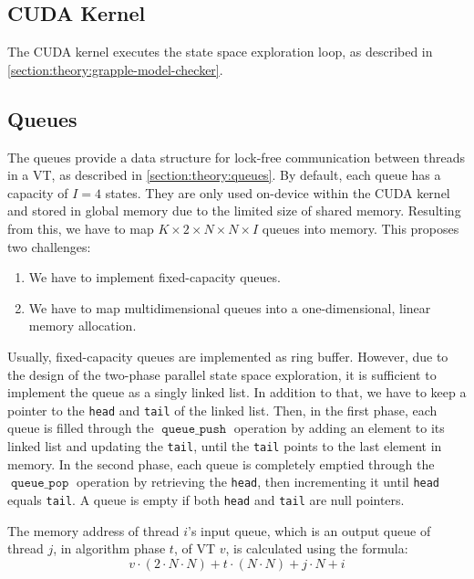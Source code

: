 \documentclass[
fancyheadings, %
%
%
]{stsreprt}
\DeclareMathOperator{\qPop}{\texttt{queue\_pop}}
\DeclareMathOperator{\qPush}{\texttt{queue\_push}}
\begin{document}
\subsection{CUDA Kernel}

The CUDA kernel executes the state space exploration loop, as described in \cref{section:theory:grapple-model-checker}.


\subsection{Queues}

The queues provide a data structure for lock-free communication between threads in a VT, as described in \cref{section:theory:queues}.
By default, each queue has a capacity of $I=4$ states.
They are only used on-device within the CUDA kernel and stored in global memory due to the limited size of shared memory.
Resulting from this, we have to map $K \times 2 \times N \times N \times I$ queues into memory.
This proposes two challenges:

\begin{enumerate}
    \item We have to implement fixed-capacity queues.
    \item We have to map multidimensional queues into a one-dimensional, linear memory allocation.
\end{enumerate}

Usually, fixed-capacity queues are implemented as ring buffer.
However, due to the design of the two-phase parallel state space exploration, it is sufficient to implement the queue as a singly linked list.
In addition to that, we have to keep a pointer to the \texttt{head} and \texttt{tail} of the linked list.
Then, in the first phase, each queue is filled through the $\qPush$ operation by adding an element to its linked list and updating the \texttt{tail}, until the \texttt{tail} points to the last element in memory.
In the second phase, each queue is completely emptied through the $\qPop$ operation by retrieving the \texttt{head}, then incrementing it until \texttt{head} equals \texttt{tail}.
A queue is empty if both \texttt{head} and \texttt{tail} are null pointers.

The memory address of thread $i$'s input queue, which is an output queue of thread $j$, in algorithm phase $t$, of VT $v$, is calculated using the formula:
\[v \cdot (2 \cdot N \cdot N) + t \cdot (N \cdot N) + j \cdot N + i\]
\end{document}
